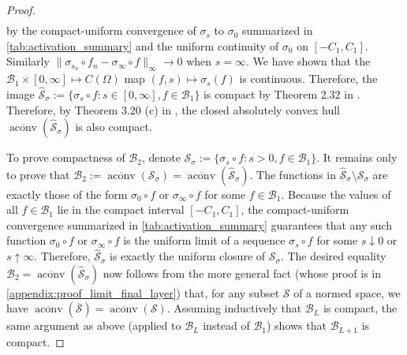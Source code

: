 \documentclass{article}
\DeclareMathOperator{\aconv}{\mathrm{aconv}}
\def\cB{{\mathcal{B}}}
\def\cS{{\mathcal{S}}}
\begin{document}
\begin{appendices}
\begin{proof}
\begin{align}
\end{align}
by the compact-uniform convergence of $\sigma_s$ to $\sigma_0$ summarized in \cref{tab:activation_summary} and the uniform continuity of $\sigma_0$ on $[-C_1,C_1]$. Similarly $\| \sigma_{s_n} \circ f_n - \sigma_\infty \circ f \|_\infty \to 0$ when $s=\infty$. We have shown that the $\cB_1 \times [0,\infty] \mapsto C(\Omega)$ map $(f,s) \mapsto \sigma_s(f)$ is continuous. Therefore, the image $\widehat{\cS}_\sigma := \{ \sigma_s \circ f: s \in [0,\infty], f \in \cB_1 \}$ is compact by Theorem 2.32 in \cite{aliprantis2006infinite}. Therefore, by Theorem 3.20 (c) in \cite{rudin1991functional}, the closed absolutely convex hull $\overline{\aconv}(\widehat{\cS}_\sigma)$ is also compact.

To prove compactness of $\cB_2$, denote $\cS_\sigma := \{ \sigma_s \circ f: s > 0, f \in \cB_1 \}$. It remains only to prove that $\cB_2 := \overline{\aconv}(\cS_\sigma) = \overline{\aconv}(\widehat{\cS}_\sigma)$. The functions in $\widehat{\cS}_\sigma \setminus \cS_\sigma$ are exactly those of the form $\sigma_0 \circ f$ or $\sigma_\infty \circ f$ for some $f \in \cB_1$. Because the values of all $f \in \cB_1$ lie in the compact interval $[-C_1, C_1]$, the compact-uniform convergence summarized in \cref{tab:activation_summary} guarantees that any such function $\sigma_0 \circ f$ or $\sigma_\infty \circ f$ is the uniform limit of a sequence $\sigma_s \circ f$ for some $s \downarrow 0$ or $s \uparrow \infty$. Therefore, $\widehat{\cS}_\sigma$ is exactly the uniform closure of $\cS_\sigma$. The desired equality $\cB_2 = \overline{\aconv}(\widehat{\cS}_\sigma)$ now follows from the more general fact (whose proof is in \cref{appendix:proof_limit_final_layer}) that, for any subset $\cS$ of a normed space, we have $\overline{\aconv}(\overline{\cS}) = \overline{\aconv}(\cS)$. Assuming inductively that $\cB_L$ is compact, the same argument as above (applied to $\cB_L$ instead of $\cB_1$) shows that $\cB_{L+1}$ is compact.




\end{proof}
\end{appendices}
\end{document}
